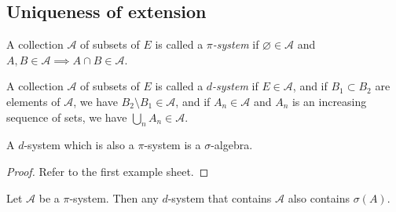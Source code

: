 \subsection{Uniqueness of extension}
\begin{definition}
	A collection \( \mathcal A \) of subsets of \( E \) is called a \emph{\( \pi \)-system} if \( \varnothing \in \mathcal A \) and \( A, B \in \mathcal A \implies A \cap B \in \mathcal A \).
\end{definition}
\begin{definition}
	A collection \( \mathcal A \) of subsets of \( E \) is called a \emph{\( d \)-system} if \( E \in \mathcal A \), and if \( B_1 \subset B_2 \) are elements of \( \mathcal A \), we have \( B_2 \setminus B_1 \in \mathcal A \), and if \( A_n \in \mathcal A \) and \( A_n \) is an increasing sequence of sets, we have \( \bigcup_n A_n \in \mathcal A \).
\end{definition}
\begin{proposition}
	A \( d \)-system which is also a \( \pi \)-system is a \( \sigma \)-algebra.
\end{proposition}
\begin{proof}
	Refer to the first example sheet.
\end{proof}
\begin{lemma}[Dynkin]
	Let \( \mathcal A \) be a \( \pi \)-system.
	Then any \( d \)-system that contains \( \mathcal A \) also contains \( \sigma(A) \).
\end{lemma}
